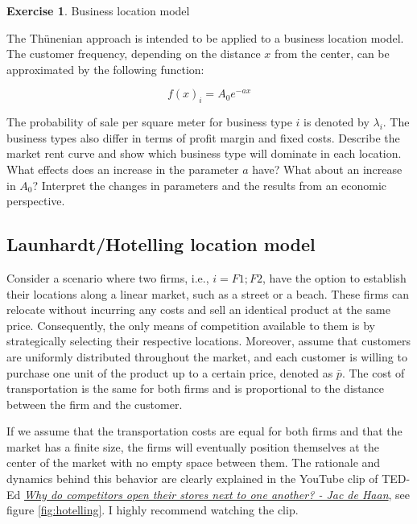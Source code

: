 \documentclass[
  12pt,
  oneside]{book}
\theoremstyle{definition}
\theoremstyle{definition}
\theoremstyle{definition}
\newtheorem{exercise}{Exercise}[chapter]
\theoremstyle{definition}
\theoremstyle{remark}
\begin{document}
\begin{exercise}
\protect\hypertarget{exr:thuenen2}{}\label{exr:thuenen2}Business location model

The Thünenian approach is intended to be applied to a business location model. The customer frequency, depending on the distance \(x\) from the center, can be approximated by the following function:

\[ f(x)_i = A_{0} e^{-a x} \]

The probability of sale per square meter for business type \(i\) is denoted by \(\lambda_i\). The business types also differ in terms of profit margin and fixed costs. Describe the market rent curve and show which business type will dominate in each location. What effects does an increase in the parameter \(a\) have? What about an increase in \(A_0\)? Interpret the changes in parameters and the results from an economic perspective.
\end{exercise}

\hypertarget{launhardthotelling-location-model}{%
\subsection{Launhardt/Hotelling location model}\label{launhardthotelling-location-model}}

Consider a scenario where two firms, i.e., \(i={F1;F2}\), have the option to establish their locations along a linear market, such as a street or a beach. These firms can relocate without incurring any costs and sell an identical product at the same price. Consequently, the only means of competition available to them is by strategically selecting their respective locations.
Moreover, assume that customers are uniformly distributed throughout the market, and each customer is willing to purchase one unit of the product up to a certain price, denoted as \(\bar{p}\). The cost of transportation is the same for both firms and is proportional to the distance between the firm and the customer.

If we assume that the transportation costs are equal for both firms and that the market has a finite size, the firms will eventually position themselves at the center of the market with no empty space between them. The rationale and dynamics behind this behavior are clearly explained in the YouTube clip of TED-Ed \href{https://youtu.be/jILgxeNBK_8}{\emph{Why do competitors open their stores next to one another? - Jac de Haan}}, see figure \ref{fig:hotelling}. I highly recommend watching the clip.
\end{document}
